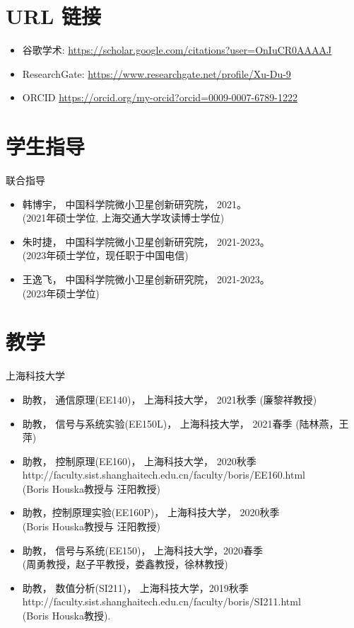 \documentclass[paper=a4,fontsize=11pt]{scrartcl} %
\newcommand{\sepspace}{\vspace*{1em}}		%
\newcommand{\NewPart}[1]{\section*{\uppercase{#1}}}
\newcommand{\EducationEntry}[4]{
		\noindent \textbf{#1} \hfill      %
		\colorbox{White}{%
			\parbox{5cm}{%
			\hfill\color{Black}#2}} \par  %
		\noindent \textit{#3} \par        %
		\noindent\hangindent=2em\hangafter=0 \small #4 %
		\normalsize \par}
\begin{document}
\begin{CJK*}{UTF8}{gbsn}
\begin{itemize}
	
	\end{itemize}
%
\NewPart{URL 链接}
\begin{itemize}
	\item 谷歌学术: \url{https://scholar.google.com/citations?user=OnIuCR0AAAAJ}
	\item ResearchGate: \url{https://www.researchgate.net/profile/Xu-Du-9}
	\item ORCID \url{https://orcid.org/my-orcid?orcid=0009-0007-6789-1222}
\end{itemize}
\NewPart{学生指导}{联合指导}
\begin{itemize}
	\item 韩博宇， 中国科学院微小卫星创新研究院， 2021。\\
	(2021年硕士学位, 上海交通大学攻读博士学位)
	\item 朱时捷， 中国科学院微小卫星创新研究院， 2021-2023。\\
	(2023年硕士学位，现任职于中国电信)
	\item 王逸飞， 中国科学院微小卫星创新研究院， 2021-2023。\\
	(2023年硕士学位)
\end{itemize}

\NewPart{教学}{上海科技大学}
\begin{itemize}
	
	
	\item{助教， 	通信原理(EE140)， 上海科技大学， 2021秋季 (廉黎祥教授)}
	
	\item{助教，  信号与系统实验(EE150L)， 上海科技大学， 2021春季 (陆林燕，王萍)}
	
	\item{助教， 控制原理(EE160)， 上海科技大学， 2020秋季\\ 
		http://faculty.sist.shanghaitech.edu.cn/faculty/boris/EE160.html\\
		(Boris Houska教授与 汪阳教授)
	}
	
	\item{助教，控制原理实验(EE160P)， 上海科技大学， 2020秋季\\ (Boris Houska教授与 汪阳教授)}
	
	\item{助教， 信号与系统(EE150)，  上海科技大学，2020春季 \\ (周勇教授，赵子平教授，娄鑫教授，徐林教授)}
	
	\item{助教， 数值分析(SI211)， 上海科技大学，2019秋季\\ 
		{http://faculty.sist.shanghaitech.edu.cn/faculty/boris/SI211.html}\\
		(Boris Houska教授).
	}
	

\end{itemize}
\end{CJK*}
\end{document}
